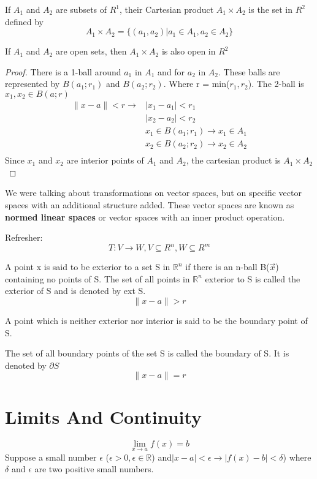 \documentclass[twoside]{report}
\begin{document}
If $A_1$ and $A_2$ are subsets of $R^1$, their Cartesian product $A_1 \times A_2$ is the set in $R^2$ defined by 
\[
   A_1 \times A_2 = \{(a_1,a_2)| a_1 \in A_1, a_2 \in A_2\}
\]
\begin{theorem}
   If $A_1$ and $A_2$ are open sets, then $A_1 \times A_2$ is also open in $R^2$
\end{theorem}
\begin{proof}
There is a 1-ball around $a_1$ in $A_1$ and for $a_2$ in $A_2$. These balls are represented by $B(a_1;r_1)$ and $B(a_2;r_2)$. Where r = min($r_1,r_2$). The 2-ball is $x_1, x_2 \in B(a;r)$ 
\begin{align*}
   \|x - a\| < r \rightarrow & |x_1 - a_1| < r_1 \\
			     & |x_2 - a_2| < r_2 \\ 
			     & x_1 \in B(a_1; r_1) \rightarrow x_1 \in A_1 \\ 
			     & x_2 \in B(a_2; r_2) \rightarrow x_2 \in A_2 \\
\end{align*}
Since $x_1$ and $x_2$ are interior points of $A_1$ and $A_2$, the cartesian product is $A_1 \times A_2$
\end{proof}

We were talking about transformations on  vector spaces, but on specific vector spaces with an additional structure added. These vector spaces are known as \textbf{normed linear spaces} or vector spaces with an inner product operation. 

Refresher:
\[
	T : V \rightarrow W, V \subseteq R^n , W \subseteq R^m
\]

\begin{definition}
   A point x is said to be exterior to a set S in $\mathbb{R}^n$ if there is an n-ball B($\vec{x}$)	containing no points of S. The set of all points in $\mathbb{R}^n$ exterior to S is called the exterior of S and is denoted by ext S. 
   \[
   	\| x - a \| > r
   \]

   A point which is neither exterior nor interior is said to be the boundary point of S.
   
   The set of all boundary points of the set S is called the boundary of S. It is denoted by $\partial S$
   \[
   	\| x - a \| = r
   \]
\end{definition}
\section{Limits And Continuity} %
\[
   \lim_{x \rightarrow a} f(x) = b
\]
Suppose a small number $\epsilon$ ($\epsilon > 0, \epsilon \in \mathbb{R}$) and$|x - a| < \epsilon \rightarrow |f(x) - b| < \delta$) where $\delta$ and $\epsilon$ are two positive small numbers.
\end{document}
